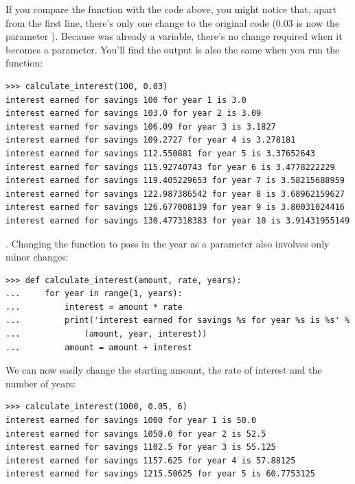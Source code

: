 If you compare the function with the code above, you might notice that, apart from the first line, there's only one change to the original code (0.03 is now the parameter ). Because  was already a variable, there's no change required when it becomes a parameter. You'll find the output is also the same when you run the function:

\begin{listing}
\begin{verbatim}
>>> calculate_interest(100, 0.03)
interest earned for savings 100 for year 1 is 3.0
interest earned for savings 103.0 for year 2 is 3.09
interest earned for savings 106.09 for year 3 is 3.1827
interest earned for savings 109.2727 for year 4 is 3.278181
interest earned for savings 112.550881 for year 5 is 3.37652643
interest earned for savings 115.92740743 for year 6 is 3.4778222229
interest earned for savings 119.405229653 for year 7 is 3.58215688959
interest earned for savings 122.987386542 for year 8 is 3.68962159627
interest earned for savings 126.677008139 for year 9 is 3.80031024416
interest earned for savings 130.477318383 for year 10 is 3.91431955149
\end{verbatim}
\end{listing}

. Changing the function to pass in the year as a parameter also involves only minor changes:

\begin{listing}
\begin{verbatim}
>>> def calculate_interest(amount, rate, years):
...     for year in range(1, years):
...         interest = amount * rate
...         print('interest earned for savings %s for year %s is %s' %
...             (amount, year, interest))
...         amount = amount + interest
\end{verbatim}
\end{listing}

\noindent
We can now easily change the starting amount, the rate of interest and the number of years:

\begin{listing}
\begin{verbatim}
>>> calculate_interest(1000, 0.05, 6)
interest earned for savings 1000 for year 1 is 50.0
interest earned for savings 1050.0 for year 2 is 52.5
interest earned for savings 1102.5 for year 3 is 55.125
interest earned for savings 1157.625 for year 4 is 57.88125
interest earned for savings 1215.50625 for year 5 is 60.7753125
\end{verbatim}
\end{listing}

